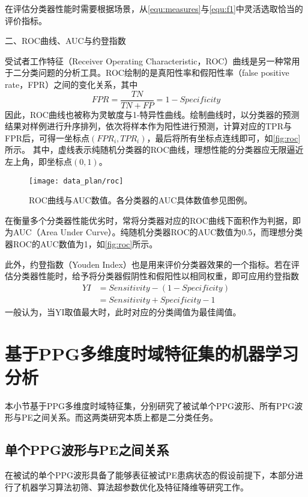 在评估分类器性能时需要根据场景，从\autoref{equ:measures}与\autoref{equ:f1}中灵活选取恰当的评价指标。

二、ROC曲线、AUC与约登指数

受试者工作特征（Receiver Operating Characteristic，ROC）曲线是另一种常用于二分类问题的分析工具。ROC绘制的是真阳性率和假阳性率（false positive rate，FPR）之间的变化关系，其中
\begin{equation}
      \label{equ:fpr}
      FPR=\frac{TN}{TN+FP}=1-Specificity
\end{equation}
因此，ROC曲线也被称为灵敏度与1-特异性曲线。绘制曲线时，以分类器的预测结果对样例进行升序排列，依次将样本作为阳性进行预测，计算对应的TPR与FPR后，可得一坐标点$({FPR}_i,{TPR}_i)$，最后将所有坐标点连线即可，如\autoref{fig:roc}所示。
其中，虚线表示纯随机分类器的ROC曲线，理想性能的分类器应无限逼近左上角，即坐标点$(0,1)$。
\begin{figure}[htbp]
      \centering
      \texttt{[image: data\_plan/roc]}
      \caption[ROC曲线与AUC数值]{\label{fig:roc}ROC曲线与AUC数值。各分类器的AUC具体数值参见图例。}
\end{figure}

在衡量多个分类器性能优劣时，常将分类器对应的ROC曲线下面积作为判据，即为AUC（Area Under Curve）。纯随机分类器ROC的AUC数值为0.5，而理想分类器ROC的AUC数值为1，如\autoref{fig:roc}所示。

此外，约登指数（Youden Index）也是用来评价分类器效果的一个指标。若在评估分类器性能时，给予将分类器假阴性和假阳性以相同权重，即可应用约登指数
\begin{equation}
      \label{equ:yi}
      \begin{aligned}
            YI&=Sensitivity-(1-Specificity)\\
            &=Sensitivity+Specificity-1
      \end{aligned}
\end{equation}
一般认为，当YI取值最大时，此时对应的分类阈值为最佳阈值\cite{cwl}。

\section{基于PPG多维度时域特征集的机器学习分析}
本小节基于PPG多维度时域特征集，分别研究了被试单个PPG波形、所有PPG波形与PE之间关系。而这两类研究本质上都是二分类任务。
\subsection{单个PPG波形与PE之间关系}
在被试的单个PPG波形具备了能够表征被试PE患病状态的假设前提下，本部分进行了机器学习算法初筛、算法超参数优化及特征降维等研究工作。

